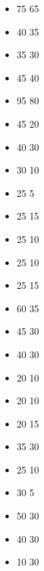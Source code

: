 

\subtitle{2022 beta 1}


\begin{itemize}
	\item \ledgerofsouls{} 75 \costdown{} 65
	\item \lugarsdice{} 40 \costdown{} 35
	\item \lifeforcetalisman{} 35 \costdown{} 30
	\item \scurryingveil{} 45 \costdown{} 40
	
	\item \ironhusk{} 95 \costdown{} 80
	\item \kaleidoscopicflesh{} 45 \costdown{} 20
	\item \hammerhand{} 40 \costdown{} 30
	\item \livingshield{} 30 \costdown{} 10
	\item \brimstonesecretions{} 25 \costdown{} 5
	\item \centipedelegs{} 25 \costdown{} 15
	\item \chitinousscales{} 25 \costdown{} 10
	\item \darkhide{} 25 \costdown{} 10
	\item \venomsacs{} 25 \costdown{} 15
	\item \broodmother{} 60 \costdown{} 35
	\item \digestivevomit{} 45 \costdown{} 30
	\item \unhingingjaw{} 40 \costdown{} 30
	\item \diviningsnout{} 20 \costdown{} 10
	\item \graspingproboscis{} 20 \costdown{} 10
	\item \smotheringcoils{} 20 \costdown{} 15
	\item \roaminghands{} 35 \costdown{} 30
	\item \hornsofhubris{} 25\costdown{} 10
	\item \segmentedshell{} 30 \costdown{} 5
	\item \whipcracktail{} 50 \costdown{} 30
	\item \redhaze{} 40 \costdown{} 30
	\item \incendiaryichor{} 10 \costdown{} 30
	

\end{itemize}
